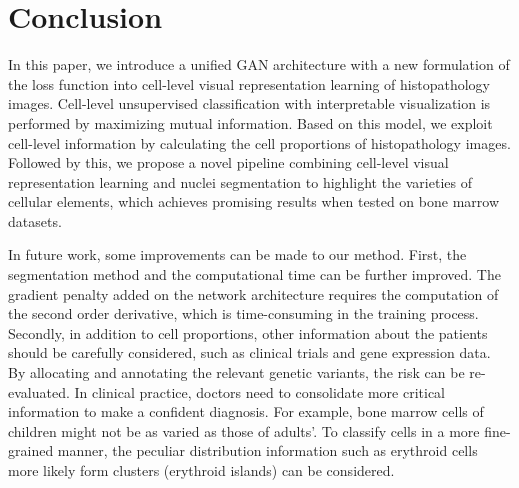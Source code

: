 \documentclass[journal]{IEEEtran}
\begin{document}
\section{Conclusion}

In this paper, we introduce a unified GAN architecture with a new formulation of the loss function into cell-level visual representation learning of histopathology images. Cell-level unsupervised classification with interpretable visualization is performed by maximizing mutual information. Based on this model, we exploit cell-level information by calculating the cell proportions of histopathology images. Followed by this, we propose a novel pipeline combining cell-level visual representation learning and nuclei segmentation to highlight the varieties of cellular elements, which achieves promising results when tested on bone marrow datasets.

In future work, some improvements can be made to our method. First, the segmentation method and the computational time can be further improved. The gradient penalty added on the network architecture requires the computation of the second order derivative, which is time-consuming in the training process. Secondly, in addition to cell proportions, other information about the patients should be carefully considered, such as clinical trials and gene expression data. By allocating and annotating the relevant genetic variants, the risk can be re-evaluated. In clinical practice, doctors need to consolidate more critical information to make a confident diagnosis. For example, bone marrow cells of children might not be as varied as those of adults'. To classify cells in a more fine-grained manner, the peculiar distribution information such as erythroid cells more likely form clusters (erythroid islands) can be considered.
\end{document}
